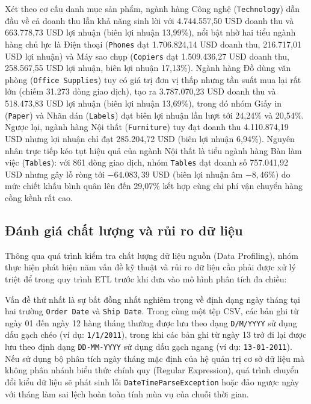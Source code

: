 Xét theo cơ cấu danh mục sản phẩm, ngành hàng Công nghệ (\texttt{Technology}) dẫn đầu về cả doanh thu lẫn khả năng sinh lời với 4.744.557,50 USD doanh thu và 663.778,73 USD lợi nhuận (biên lợi nhuận 13,99\%), nổi bật nhờ hai tiểu ngành hàng chủ lực là Điện thoại (\texttt{Phones} đạt 1.706.824,14 USD doanh thu, 216.717,01 USD lợi nhuận) và Máy sao chụp (\texttt{Copiers} đạt 1.509.436,27 USD doanh thu, 258.567,55 USD lợi nhuận, biên lợi nhuận 17,13\%). Ngành hàng Đồ dùng văn phòng (\texttt{Office Supplies}) tuy có giá trị đơn vị thấp nhưng tần suất mua lại rất lớn (chiếm 31.273 dòng giao dịch), tạo ra 3.787.070,23 USD doanh thu và 518.473,83 USD lợi nhuận (biên lợi nhuận 13,69\%), trong đó nhóm Giấy in (\texttt{Paper}) và Nhãn dán (\texttt{Labels}) đạt biên lợi nhuận lần lượt tới 24,24\% và 20,54\%. Ngược lại, ngành hàng Nội thất (\texttt{Furniture}) tuy đạt doanh thu 4.110.874,19 USD nhưng lợi nhuận chỉ đạt 285.204,72 USD (biên lợi nhuận 6,94\%). Nguyên nhân trực tiếp kéo tụt hiệu quả của ngành Nội thất là tiểu ngành hàng Bàn làm việc (\texttt{Tables}): với 861 dòng giao dịch, nhóm \texttt{Tables} đạt doanh số 757.041,92 USD nhưng gây lỗ ròng tới $-64.083,39$ USD (biên lợi nhuận âm $-8,46\%$) do mức chiết khấu bình quân lên đến 29,07\% kết hợp cùng chi phí vận chuyển hàng cồng kềnh rất cao.

\subsection{Đánh giá chất lượng và rủi ro dữ liệu}

Thông qua quá trình kiểm tra chất lượng dữ liệu nguồn (Data Profiling), nhóm thực hiện phát hiện năm vấn đề kỹ thuật và rủi ro dữ liệu cần phải được xử lý triệt để trong quy trình ETL trước khi đưa vào mô hình phân tích đa chiều:

Vấn đề thứ nhất là sự bất đồng nhất nghiêm trọng về định dạng ngày tháng tại hai trường \texttt{Order Date} và \texttt{Ship Date}. Trong cùng một tệp CSV, các bản ghi từ ngày 01 đến ngày 12 hàng tháng thường được lưu theo dạng \texttt{D/M/YYYY} sử dụng dấu gạch chéo (ví dụ: \texttt{1/1/2011}), trong khi các bản ghi từ ngày 13 trở đi lại được lưu theo định dạng \texttt{DD-MM-YYYY} sử dụng dấu gạch ngang (ví dụ: \texttt{13-01-2011}). Nếu sử dụng bộ phân tích ngày tháng mặc định của hệ quản trị cơ sở dữ liệu mà không phân nhánh biểu thức chính quy (Regular Expression), quá trình chuyển đổi kiểu dữ liệu sẽ phát sinh lỗi \texttt{DateTimeParseException} hoặc đảo ngược ngày với tháng làm sai lệch hoàn toàn tính mùa vụ của chuỗi thời gian.

